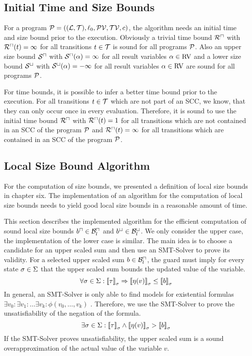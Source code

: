 \subsection{Initial Time and Size Bounds}

For a program $\mathcal{P} = ((\mathcal{L}, \mathcal{T}), \ell_0, \mathcal{PV}, \mathcal{TV}, c)$, the algorithm needs an initial time and size bound prior to the execution.
Obviously a trivial time bound ${\mathcal{R}^\sqcap}$ with ${\mathcal{R}^\sqcap}(t) = \infty$ for all transitions $t \in \mathcal{T}$ is sound for all programs $\mathcal{P}$.
Also an upper size bound ${\mathcal{S}^\sqcap}$ with ${\mathcal{S}^\sqcap}(\alpha) = \infty$ for all result variables $\alpha \in \text{RV}$ and a lower size bound ${\mathcal{S}^\sqcup}$ with ${\mathcal{S}^\sqcup}(\alpha) = -\infty$ for all result variables $\alpha \in \text{RV}$ are sound for all programs $\mathcal{P}$.

For time bounds, it is possible to infer a better time bound prior to the execution.
For all transitions $t \in \mathcal{T}$ which are not part of an SCC, we know, that they can only occur once in every evaluation.
Therefore, it is sound to use the initial time bound ${\mathcal{R}^\sqcap}$ with ${\mathcal{R}^\sqcap}(t) = 1$ for all transitions which are not contained in an SCC of the program $\mathcal{P}$ and ${\mathcal{R}^\sqcap}(t) = \infty$ for all transitions which are contained in an SCC of the program $\mathcal{P}$.

\subsection{Local Size Bound Algorithm}

For the computation of size bounds, we presented a definition of local size bounds in chapter six.
The implementation of an algorithm for the computation of local size bounds needs to yield good local size bounds in a reasonable amount of time.

This section describes the implemented algorithm for the efficient computation of sound local size bounds $b^\sqcap \in \mathcal{B}^\sqcap_l$ and $b^\sqcup \in \mathcal{B}^\sqcup_l$.
We only consider the upper case, the implementation of the lower case is similar.
The main idea is to choose a candidate for an upper scaled sum and then use an SMT-Solver to prove its validity.
For a selected upper scaled sum $b \in \mathcal{B}^\sqcap_l$, the guard must imply for every state $\sigma \in \Sigma$ that the upper scaled sum bounds the updated value of the variable.
\[ \forall \sigma \in \Sigma: \left\llbracket \tau \right\rrbracket_{\sigma} \Rightarrow \left\llbracket \eta(v) \right\rrbracket_{\sigma} \leq \left\llbracket b \right\rrbracket_{\sigma} \]
In general, an SMT-Solver is only able to find models for existential formulas $\exists v_0: \exists v_1: \dots \exists v_k: \phi(v_0, \dots, v_k)$ \cite{smt}.
Therefore, we use the SMT-Solver to prove the unsatisfiability of the negation of the formula.
\[ \exists \sigma \in \Sigma: \left\llbracket \tau \right\rrbracket_{\sigma} \wedge \left\llbracket \eta(v) \right\rrbracket_{\sigma} > \left\llbracket b \right\rrbracket_{\sigma} \]
If the SMT-Solver proves unsatisfiability, the upper scaled sum is a sound overapproximation of the actual value of the variable $v$.

